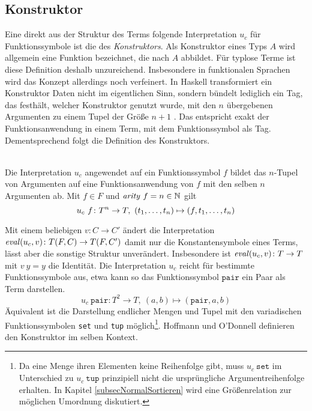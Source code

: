 \subsection{Konstruktor}
Eine direkt aus der Struktur des Terms folgende Interpretation $u_c$ für Funktionssymbole ist die des \emph{\Glspl{Konstruktor}}. Als Konstruktor eines Typs $A$ wird allgemein eine Funktion bezeichnet, die nach $A$ abbildet. Für typlose Terme ist diese Definition deshalb unzureichend. 
Insbesondere in funktionalen Sprachen wird das Konzept allerdings noch verfeinert. In Haskell transformiert ein Konstruktor Daten nicht im eigentlichen Sinn, sondern bündelt lediglich ein Tag, das festhält, welcher Konstruktor genutzt wurde, mit den $n$ übergebenen Argumenten zu einem Tupel der Größe $n+1$ \cite{haskellConstructor}. Das entspricht exakt der Funktionsanwendung in einem Term, mit dem Funktionssymbol als Tag. Dementsprechend folgt die Definition des Konstruktors.

\begin{definition}~\\
Die Interpretation $u_c$ angewendet auf ein Funktionssymbol $f$ bildet das $n$-Tupel von Argumenten auf eine Funktionsanwendung von $f$ mit den selben $n$ Argumenten ab. 
 Mit $f \in F$ und $\mathit{arity}~f = n \in \mathbb N$ 
gilt 
$$u_c~f \colon T^n \rightarrow T, ~({t}_{1}, \dots, {t}_{n}) \mapsto (f, {t}_{1}, \dots, {t}_{n})$$
\end{definition}

Mit einem beliebigen $v \colon C \rightarrow C'$ ändert die Interpretation {$\mathit{eval}(u_c, v) \colon T(F, C) \rightarrow T(F, C')$} damit nur die Konstantensymbole eines Terms, lässt aber die sonstige Struktur unverändert. Insbesondere ist $\mathit{eval}(u_c, v) \colon T \rightarrow T$ mit $v~y = y$ die Identität.
Die Interpretation $u_c$ reicht für bestimmte Funktionssymbole aus, etwa kann so das Funktionssymbol $\texttt{pair}$ ein Paar als Term darstellen.
$$u_c~\texttt{pair} \colon T^2 \rightarrow T, ~(a, b) \mapsto (\texttt{pair}, a, b)$$
Äquivalent ist die Darstellung endlicher Mengen und Tupel mit den variadischen Funktionssymbolen \texttt{set} und \texttt{tup} möglich\footnote{Da eine Menge ihren Elementen keine Reihenfolge gibt, muss $u_c~\texttt{set}$ im Unterschied zu $u_c~\texttt{tup}$ prinzipiell nicht die ursprüngliche Argumentreihenfolge erhalten. In Kapitel \ref{subsecNormalSortieren} wird eine Größenrelation zur möglichen Umordnung diskutiert.}. 
Hoffmann und O'Donnell \cite{hoffmann1982programming} definieren den Konstruktor im selben Kontext.


